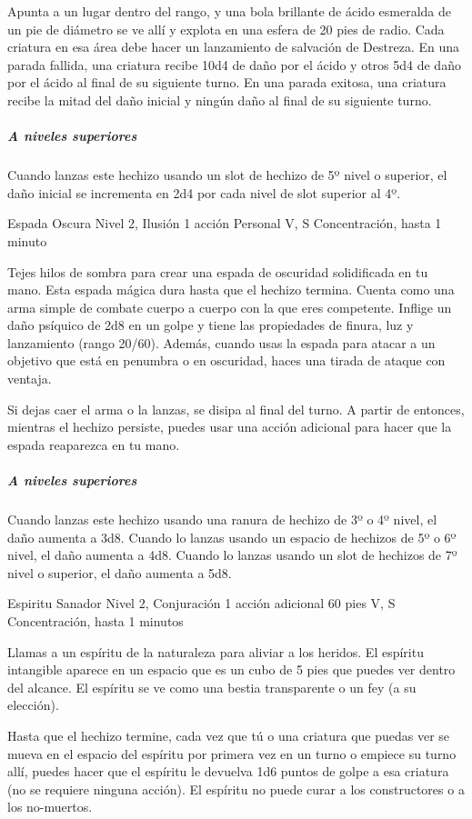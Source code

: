 \documentclass[a4paper,twocolumn,openany,10pt]{dndbook}
\begin{document}
	Apunta a un lugar dentro del rango, y una bola brillante de ácido esmeralda de un pie de diámetro se ve allí y explota en
	una esfera de 20 pies de radio. Cada criatura en esa área debe hacer un lanzamiento de salvación de Destreza. En una parada
	fallida, una criatura recibe 10d4 de daño por el ácido y otros 5d4 de daño por el ácido al final de su siguiente turno. En
	una parada exitosa, una criatura recibe la mitad del daño inicial y ningún daño al final de su siguiente turno.
	
	\subparagraph{A niveles superiores} Cuando lanzas este hechizo usando un slot de hechizo de 5º nivel o superior, el daño
	inicial se incrementa en 2d4 por cada nivel de slot superior al 4º. 

\spellheader%
	{Espada Oscura}
	{Nivel 2, Ilusión}
	{1 acción}
	{Personal}
	{V, S}
	{Concentración, hasta 1 minuto}
	
	Tejes hilos de sombra para crear una espada de oscuridad solidificada en tu mano. Esta espada mágica dura hasta que el
	hechizo termina. Cuenta como una arma simple de combate cuerpo a cuerpo con la que eres competente. Inflige un daño psíquico
	de 2d8 en un golpe y tiene las propiedades de finura, luz y lanzamiento (rango 20/60). Además, cuando usas la espada para
	atacar a un objetivo que está en penumbra o en oscuridad, haces una tirada de ataque con ventaja.
	
	Si dejas caer el arma o la lanzas, se disipa al final del turno. A partir de entonces, mientras el hechizo persiste, puedes
	usar una acción adicional  para hacer que la espada reaparezca en tu mano.
	
	\subparagraph{A niveles superiores} Cuando lanzas este hechizo usando una ranura de hechizo de 3º o 4º nivel, el daño
	aumenta a 3d8. Cuando lo lanzas usando un espacio de hechizos de 5º o 6º nivel, el daño aumenta a 4d8. Cuando lo lanzas
	usando un slot de hechizos de 7º nivel o superior, el daño aumenta a 5d8. 

\spellheader%
	{Espiritu Sanador}
	{Nivel 2, Conjuración}
	{1 acción adicional}
	{60 pies}
	{V, S}
	{Concentración, hasta 1 minutos}
	
	Llamas a un espíritu de la naturaleza para aliviar a los heridos. El espíritu intangible aparece en un espacio que es un
	cubo de 5 pies que puedes ver dentro del alcance. El espíritu se ve como una bestia transparente o un fey (a su elección).
	
	Hasta que el hechizo termine, cada vez que tú o una criatura que puedas ver se mueva en el espacio del espíritu por primera
	vez en un turno o empiece su turno allí, puedes hacer que el espíritu le devuelva 1d6 puntos de golpe a esa criatura (no se
	requiere ninguna acción). El espíritu no puede curar a los constructores o a los no-muertos.
	
\end{document}

